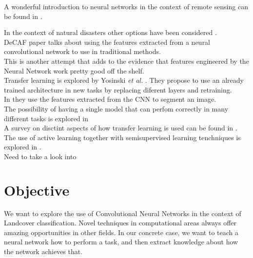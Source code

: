 A wonderful introduction to neural networks in the context of remote sensing can be found in \cite{canty2014image}.

In the context of natural disasters other options have been considered \cite{Kryvasheyeue1500779}.\\

DeCAF paper talks about using the features extracted from a neural convolutional network to use in traditional methods. \cite{DBLP:journals/corr/DonahueJVHZTD13}\\

This is another attempt that adds to the evidence that features engineered by the Neural Network work pretty good off the shelf. \cite{DBLP:journals/corr/RazavianASC14}\\

Transfer learning is explored by Yosinski \textit{et al.} \cite{DBLP:journals/corr/YosinskiCBL14}. They propose to use an already trained architecture in new tasks by replacing diferent layers and retraining.\\

In \cite{DBLP:journals/corr/LongSD14} they use the features extracted from the CNN to segment an image.\\

The possibility of having a single model that can perfom correctly in many different tasks is explored in \cite{DBLP:journals/corr/KaiserGSVPJU17}\\

A survey on disctint aspects of how transfer learning is used can be found in \cite{5288526}.\\

The use of active learning together with semisupervised learning tenchniques is explored in \cite{7956153}.\\

Need to take a look into \cite{DBLP:journals/corr/ChenPKMY14}\\


\section{Objective}

We want to explore the use of Convolutional Neural Networks in the context of Landcover classification. Novel techniques in computational areas always offer amazing opportunities in other fields. In our concrete case, we want to teach a neural network how to perform a task, and then extract knowledge about how the network achieves that.\\

